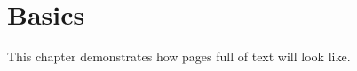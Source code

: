 
\chapter{Basics}

This chapter demonstrates how pages full of text will look like.

\lipsum[1-15]


